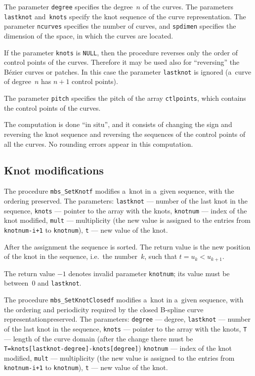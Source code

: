 The parameter \texttt{degree} specifies the degree~$n$ of the curves. The
parameters \texttt{lastknot} and~\texttt{knots} specify the knot sequence
of the curve representation. The parameter \texttt{ncurves} specifies
the number of curves, and \texttt{spdimen} specifies the dimension of the
space, in which the curves are located.

If the parameter \texttt{knots} is \texttt{NULL}, then the procedure reverses
only the order of control points of the curves. Therefore it may be used
also for ``reversing'' the B\'{e}zier curves or patches. In this case the
parameter \texttt{lastknot} is ignored (a~curve of degree~$n$ has
$n+1$ control points).

The parameter \texttt{pitch} specifies the pitch of the array \texttt{ctlpoints},
which contains the control points of the curves.

The computation is done ``in situ'', and it consists of changing the
sign and reversing the knot sequence and reversing the sequences of the
control points of all the curves. No rounding errors appear in this
computation.


\newpage
\subsection{Knot modifications}

The procedure \texttt{mbs\_SetKnotf} modifies a~knot in a~given sequence,
with the ordering preserved. The parameters:
\texttt{lastknot} --- number of the last knot in the sequence, \texttt{knots} ---
pointer to the array with the knots, \texttt{knotnum} --- index of the
knot modified, \texttt{mult} --- multiplicity (the new value is assigned to the
entries from \texttt{knotnum-i+1} to \texttt{knotnum}),
\texttt{t} --- new value of the knot.

After the assignment the sequence is sorted. The return value is
the new position of the knot in the sequence, i.e.\ the number~$k$,
such that $t=u_k<u_{k+1}$.

The return value $-1$ denotes invalid parameter \texttt{knotnum};
its value must be between~$0$ and \texttt{lastknot}.

\vspace{\bigskipamount}
The procedure \texttt{mbs\_SetKnotClosedf} modifies a~knot in a~given sequence,
with the ordering and periodicity required by the closed B-spline curve
representationpreserved. The parameters: \texttt{degree} --- degree,
\texttt{lastknot} --- number of the last knot in the sequence, \texttt{knots} ---
pointer to the array with the knots, \texttt{T} --- length of the curve domain
(after the change there must be \texttt{T=knots[lastknot-degree]-knots[degree]})
 \texttt{knotnum} --- index of the
knot modified, \texttt{mult} --- multiplicity (the new value is assigned to the
entries from \texttt{knotnum-i+1} to \texttt{knotnum}),
\texttt{t} --- new value of the knot.

